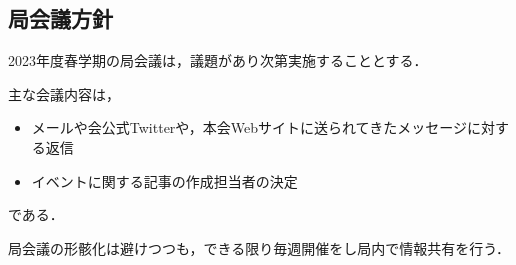 \subsection*{局会議方針}


2023年度春学期の局会議は，議題があり次第実施することとする．

主な会議内容は，
\begin{itemize}
	\item メールや会公式Twitterや，本会Webサイトに送られてきたメッセージに対する返信
	\item イベントに関する記事の作成担当者の決定
\end{itemize}
である．

局会議の形骸化は避けつつも，できる限り毎週開催をし局内で情報共有を行う．
